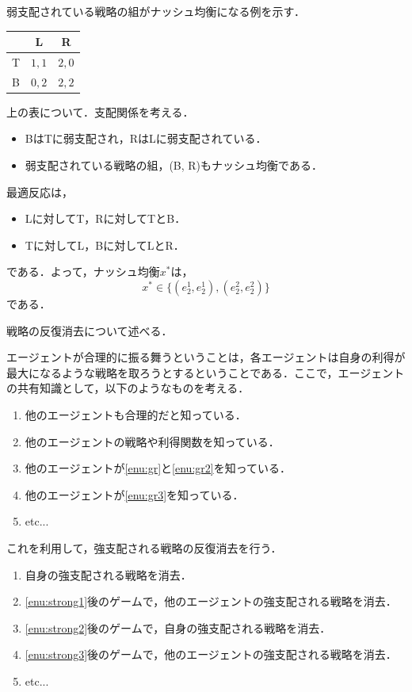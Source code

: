 \documentclass{jsreport}
\begin{document}
弱支配されている戦略の組がナッシュ均衡になる例を示す．
\begin{table}[H]
\centering
  \begin{tabular}{c|c|c}
        & L & R  \\ \hline
    T & $1, 1$ & $2, 0$ \\ \hline
    B & $0, 2$ & $2, 2$ \\
  \end{tabular}
\end{table}
上の表について．支配関係を考える．
\begin{itemize}
  \item BはTに弱支配され，RはLに弱支配されている．
  \item 弱支配されている戦略の組，(B, R)もナッシュ均衡である．
\end{itemize}
最適反応は，
\begin{itemize}
  \item Lに対してT，Rに対してTとB．
  \item Tに対してL，Bに対してLとR．
\end{itemize}
である．よって，ナッシュ均衡$x^{*}$は，
\begin{equation}
  x^{*} \in \{(e_2^1, e_2^1), (e_2^2, e_2^2)\} \nonumber
\end{equation}
である．

戦略の反復消去について述べる．

エージェントが合理的に振る舞うということは，各エージェントは自身の利得が最大になるような戦略を取ろうとするということである．ここで，エージェントの共有知識として，以下のようなものを考える．
\begin{enumerate}
  \item 他のエージェントも合理的だと知っている．\label{enu:gr}
  \item 他のエージェントの戦略や利得関数を知っている．\label{enu:gr2}
  \item 他のエージェントが\ref{enu:gr}と\ref{enu:gr2}を知っている．\label{enu:gr3}
  \item 他のエージェントが\ref{enu:gr3}を知っている．
  \item etc...
\end{enumerate}

これを利用して，強支配される戦略の反復消去を行う．
\begin{enumerate}
  \item 自身の強支配される戦略を消去．\label{enu:strong1}
  \item \ref{enu:strong1}後のゲームで，他のエージェントの強支配される戦略を消去．\label{enu:strong2}
  \item \ref{enu:strong2}後のゲームで，自身の強支配される戦略を消去．\label{enu:strong3}
  \item \ref{enu:strong3}後のゲームで，他のエージェントの強支配される戦略を消去．
  \item etc...
\end{enumerate}
\end{document}
